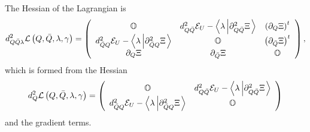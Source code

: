 \documentclass[aps,preprint]{revtex4}%
\begin{document}
The Hessian of the Lagrangian is
\begin{equation}
d_{Q\bar{Q}\lambda}^{2}\mathcal{L}\left(  Q,\bar{Q},\lambda,\gamma\right)
=\left(
\begin{array}
[c]{ccc}%
\mathbb{O} & d_{Q\bar{Q}}^{2}\mathcal{E}_{U}-\left\langle \lambda\left\vert
\partial_{Q\bar{Q}}^{2}\Xi\right.  \right\rangle  & \left(  \partial_{Q}%
\Xi\right)  ^{t}\\
d_{\bar{Q}Q}^{2}\mathcal{E}_{U}-\left\langle \lambda\left\vert \partial
_{\bar{Q}Q}^{2}\Xi\right.  \right\rangle  & \mathbb{O} & \left(
\partial_{\bar{Q}}\Xi\right)  ^{t}\\
\partial_{Q}\Xi & \partial_{\bar{Q}}\Xi & \mathbb{O}%
\end{array}
\right)  ,
\end{equation}
which is formed from the Hessian
\begin{equation}
d_{Q}^{2}\mathcal{L}\left(  Q,\bar{Q},\lambda,\gamma\right)  =\left(
\begin{array}
[c]{cc}%
\mathbb{O} & d_{Q\bar{Q}}^{2}\mathcal{E}_{U}-\left\langle \lambda\left\vert
\partial_{Q\bar{Q}}^{2}\Xi\right.  \right\rangle \\
d_{\bar{Q}Q}^{2}\mathcal{E}_{U}-\left\langle \lambda\left\vert \partial
_{\bar{Q}Q}^{2}\Xi\right.  \right\rangle  & \mathbb{O}%
\end{array}
\right)
\end{equation}
and the gradient terms.
\end{document}
